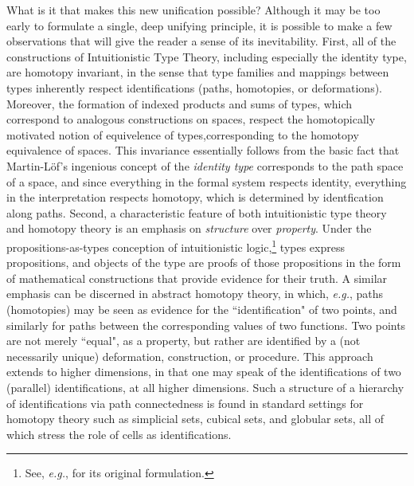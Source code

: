 \documentclass[11pt]{article}
\theoremstyle{remark}
\theoremstyle{definition}
\begin{document}
What is it that makes this new unification possible?  Although it may be too
early to formulate a single, deep unifying principle, it is possible to make a
few observations that will give the reader a sense of its inevitability.  First,
all of the constructions of Intuitionistic Type Theory, including especially
the %
identity type, are homotopy invariant, in the sense that type families and
mappings between types inherently respect identifications (paths, homotopies, or
deformations).  Moreover, the formation of indexed products and sums of types,
which correspond to analogous constructions on spaces, respect the homotopically
motivated notion of equivelence of types,corresponding to the homotopy
equivalence of spaces.  This invariance essentially follows from the basic fact
that Martin-L\"{o}f's ingenious concept of the \emph{identity type} corresponds
to the path space of a space, and since everything in the formal system respects
identity, everything in the interpretation respects homotopy, which is
determined by identfication along paths.  Second, a characteristic feature of
both intuitionistic type theory and homotopy theory is an emphasis on
\emph{structure} over \emph{property}.  Under the propositions-as-types
conception of intuitionistic logic,\footnote{See, \textit{e.g.},
  \cite{Howard:PAT} for its original formulation.} types express propositions,
and objects of the type are proofs of those propositions in the form of
mathematical constructions that provide evidence for their truth.  A similar
emphasis can be discerned in abstract homotopy theory, in which, \textit{e.g.},
paths (homotopies) may be seen as evidence for the ``identification" of two
points, and similarly for paths between the corresponding values of two
functions.  Two points are not merely ``equal", as a property, but rather are
identified by a (not necessarily unique) deformation, construction, or
procedure.  This approach extends to higher dimensions, in that one may speak of
the identifications of two (parallel) identifications, at all higher dimensions.
Such a structure of a hierarchy of identifications via path connectedness is
found in standard settings for homotopy theory such as simplicial sets, cubical
sets, and globular sets, all of which stress the role of cells as
identifications.
\end{document}
